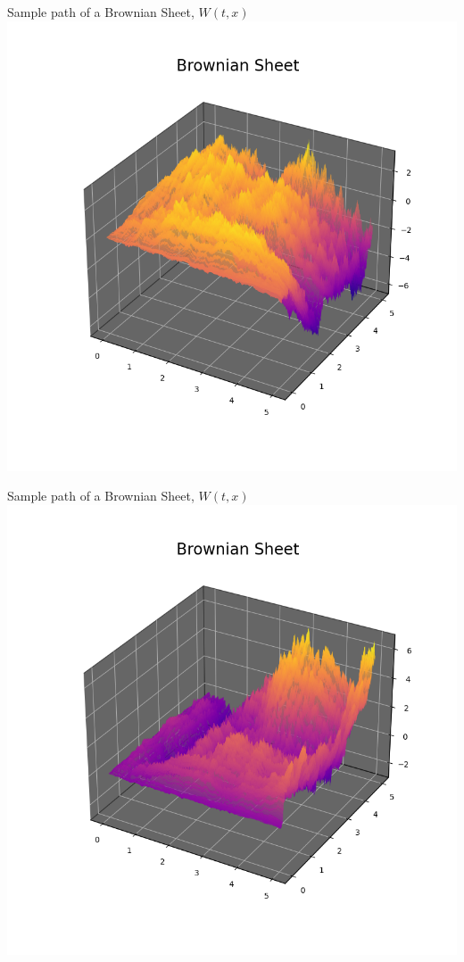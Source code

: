 \documentclass{beamer}%
\numberwithin{equation}{section}
\begin{document}
	\begin{frame}{Sample path of a Brownian Sheet, $W(t,x)$}
		\centering
		\includegraphics[scale=.5]{bsheet3.png}
	\end{frame}
	
	\begin{frame}{Sample path of a Brownian Sheet, $W(t,x)$}
		\centering
		\includegraphics[scale=.5]{bsheet1.png}
	\end{frame}
	
\end{document}

